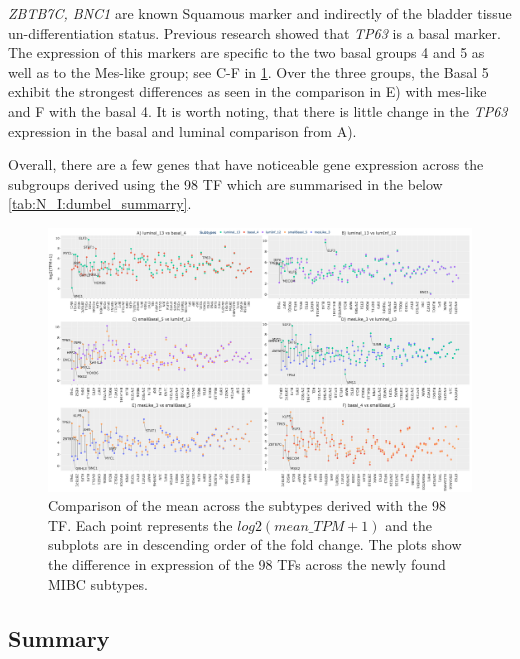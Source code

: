\textit{ZBTB7C, BNC1} are known Squamous marker \citep{Robertson2023-na,Fishwick2017-kd} and indirectly of the bladder tissue un-differentiation status. Previous research\citep{Choi2012-kk, Karni-Schmidt2011-ps} showed that \textit{TP63} is a basal marker. The expression of this markers are specific to the two basal groups 4 and 5 as well as to the Mes-like group; see C-F in \cref{fig:N_I:dumbell_sel_tfs}.  Over the three groups, the Basal 5 exhibit the strongest differences as seen in the comparison in E) with mes-like and F with the basal 4. It is worth noting, that there is little change in the \textit{TP63} expression in the basal and luminal comparison from A). 

Overall, there are a few genes that have noticeable gene expression across the subgroups derived using the 98 TF which are summarised in the below \cref{tab:N_I:dumbel_summarry}.

\begin{figure}
    \centering
    \includegraphics[width=1.0\textwidth,keepaspectratio]{Sections/Network_I/Resources/selective_pruning/dumbell_sel_tfs.png}
      \caption[Mean gene expression across the five MIBC subgroups]{Comparison of the mean across the subtypes derived with the 98 TF. Each point represents the $log2(mean\_TPM+1)$ and the subplots are in descending order of the fold change. The plots show the difference in expression of the 98 TFs across the newly found MIBC subtypes.}
    \label{fig:N_I:dumbell_sel_tfs}
\end{figure}


\subsection{Summary}

